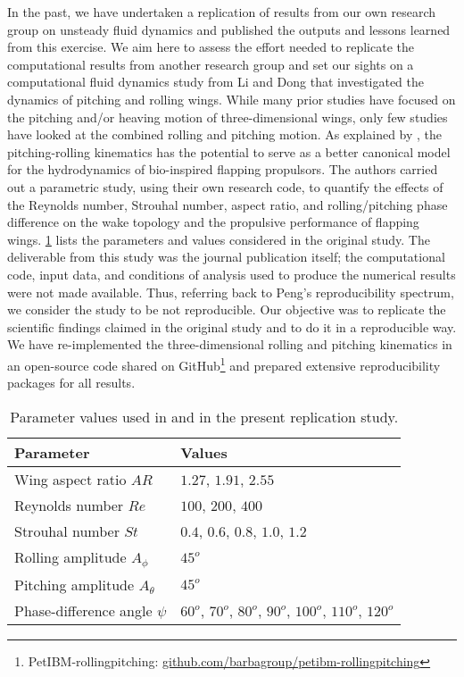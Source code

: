 In the past, we have undertaken a replication of results from our own research group on unsteady fluid dynamics\supercite{krishnan_et_al_2014} and published the outputs and lessons learned from this exercise.\supercite{mesnard_barba_2017}
We aim here to assess the effort needed to replicate the computational results from another research group and set our sights on a computational fluid dynamics study from Li and Dong\supercite{li_dong_2016} that investigated the dynamics of pitching and rolling wings.
While many prior studies have focused on the pitching and/or heaving motion of three-dimensional wings, only few studies have looked at the combined rolling and pitching motion.
As explained by \citet{li_dong_2016}, the pitching-rolling kinematics has the potential to serve as a better canonical model for the hydrodynamics of bio-inspired flapping propulsors.
The authors carried out a parametric study, using their own research code, to quantify the effects of the Reynolds number, Strouhal number, aspect ratio, and rolling/pitching phase difference on the wake topology and the propulsive performance of flapping wings.
\cref{tab:parameters} lists the parameters and values considered in the original study.
The deliverable from this study was the journal publication itself; the computational code, input data, and conditions of analysis used to produce the numerical results were not made available.
Thus, referring back to Peng's reproducibility spectrum, we consider the study to be not reproducible.
Our objective was to replicate the scientific findings claimed in the original study and to do it in a reproducible way.
We have re-implemented the three-dimensional rolling and pitching kinematics in an open-source code shared on GitHub\footnote{PetIBM-rollingpitching: \url{github.com/barbagroup/petibm-rollingpitching}} and prepared extensive reproducibility packages for all results.

\begin{table}%
  \centering
  \begin{tabular}{ll}
    \hline\hline
    Parameter & Values \\
    \hline
    Wing aspect ratio $AR$ & $1.27$, $1.91$, $2.55$ \\
    Reynolds number $Re$ & $100$, $200$, $400$ \\
    Strouhal number $St$ & $0.4$, $0.6$, $0.8$, $1.0$, $1.2$ \\
    Rolling amplitude $A_\phi$ & $45^o$ \\
    Pitching amplitude $A_\theta$ & $45^o$ \\
    Phase-difference angle $\psi$ & $60^o$, $70^o$, $80^o$, $90^o$, $100^o$, $110^o$, $120^o$ \\
    \hline\hline
  \end{tabular}
  \caption{Parameter values used in \citet{li_dong_2016} and in the present replication study.}
  \label{tab:parameters}
\end{table}

